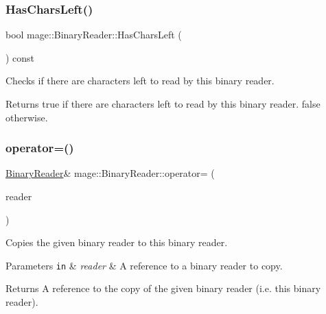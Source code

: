 \subsubsection{\texorpdfstring{Has\+Chars\+Left()}{HasCharsLeft()}}
{\footnotesize\ttfamily bool mage\+::\+Binary\+Reader\+::\+Has\+Chars\+Left (\begin{DoxyParamCaption}{ }\end{DoxyParamCaption}) const\hspace{0.3cm}{\ttfamily [protected]}}

Checks if there are characters left to read by this binary reader.

\begin{DoxyReturn}{Returns}
{\ttfamily true} if there are characters left to read by this binary reader. {\ttfamily false} otherwise. 
\end{DoxyReturn}
\hypertarget{classmage_1_1_binary_reader_a0408bb456983b4a03ae42ab69c6f4bc3}{}\label{classmage_1_1_binary_reader_a0408bb456983b4a03ae42ab69c6f4bc3} 
\subsubsection{\texorpdfstring{operator=()}{operator=()}\hspace{0.1cm}{\footnotesize\ttfamily [1/2]}}
{\footnotesize\ttfamily \hyperlink{classmage_1_1_binary_reader}{Binary\+Reader}\& mage\+::\+Binary\+Reader\+::operator= (\begin{DoxyParamCaption}\item[{const \hyperlink{classmage_1_1_binary_reader}{Binary\+Reader} \&}]{reader }\end{DoxyParamCaption})\hspace{0.3cm}{\ttfamily [delete]}}

Copies the given binary reader to this binary reader.


\begin{DoxyParams}[1]{Parameters}
\mbox{\tt in}  & {\em reader} & A reference to a binary reader to copy. \\
\hline
\end{DoxyParams}
\begin{DoxyReturn}{Returns}
A reference to the copy of the given binary reader (i.\+e. this binary reader). 
\end{DoxyReturn}
\hypertarget{classmage_1_1_binary_reader_abb971fe92727a0e86b3698dba8c586de}{}\label{classmage_1_1_binary_reader_abb971fe92727a0e86b3698dba8c586de} 
